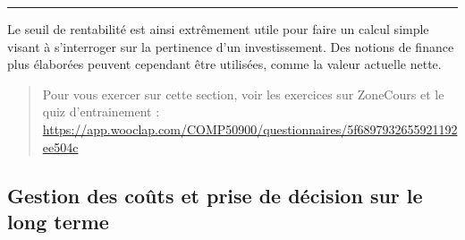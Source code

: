 \documentclass{tufte-handout}
\begin{document}
\begin{enumerate}
\noindent\rule{\textwidth}{0.5pt}

Le seuil de rentabilité est ainsi extrêmement utile pour faire un calcul simple visant à s'interroger sur la pertinence d'un investissement. Des notions de finance plus élaborées peuvent cependant être utilisées, comme la valeur actuelle nette.\\

\begin{quote}
Pour vous exercer sur cette section, voir les exercices sur ZoneCours et le quiz d'entrainement : \url{https://app.wooclap.com/COMP50900/questionnaires/5f6897932655921192ee504c}\\
\end{quote}
\end{enumerate}

\subsection{Gestion des coûts et prise de décision sur le long terme}
\label{sec:org4eef6f1}
\end{document}
